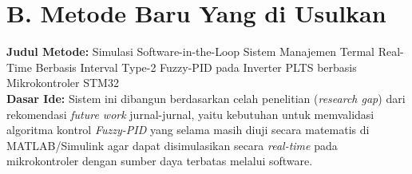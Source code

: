 \documentclass[11pt,a4paper]{article}
\begin{document}
\begin{small}
\begin{longtable}{|c|>{\raggedright\arraybackslash}p{3.2cm}|>{\raggedright\arraybackslash}p{4cm}|>{\raggedright\arraybackslash}p{4cm}|>{\raggedright\arraybackslash}p{4cm}|}
\end{longtable}
\end{small}

\newpage
\section*{B. Metode Baru Yang di Usulkan}

\noindent \textbf{Judul Metode:} Simulasi Software-in-the-Loop Sistem Manajemen Termal Real-Time Berbasis Interval Type-2 Fuzzy-PID pada Inverter PLTS berbasis Mikrokontroler STM32 \\[0.5em]

\noindent\textbf{Dasar Ide:} Sistem ini dibangun berdasarkan celah penelitian (\textit{research gap}) dari rekomendasi \textit{future work} jurnal-jurnal, yaitu kebutuhan untuk memvalidasi algoritma kontrol \textit{Fuzzy-PID} yang selama masih diuji secara matematis di MATLAB/Simulink agar dapat disimulasikan secara \textit{real-time} pada mikrokontroler dengan sumber daya terbatas melalui software.\\[0.5em]
\end{document}
